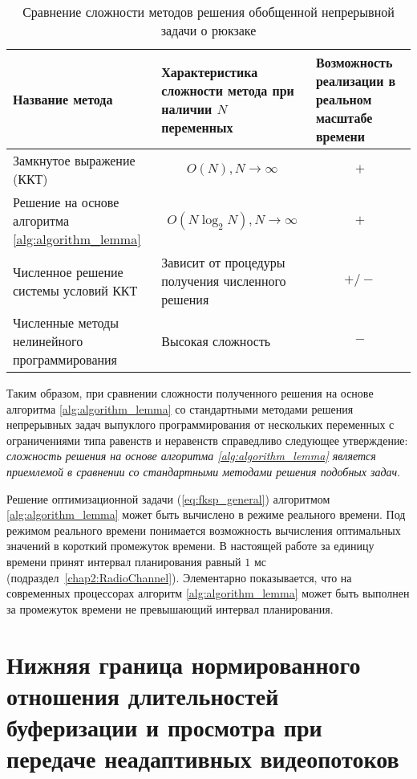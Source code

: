 \begin{table}[!h]
    \caption{Сравнение сложности методов решения обобщенной непрерывной задачи о рюкзаке}
    \begin{center}
		\label{tab:nonadaptiveComplexity}
	    \begin{tabular}{| C{5cm} | C{5cm} | C{5cm} |}
	    	\hline
	    	Название метода & Характеристика сложности метода при наличии $N$ переменных & Возможность реализации в реальном масштабе времени\\
	    	\hline
			Замкнутое выражение (ККТ) & $$O(N), N\to\infty$$ & $$+$$\\
	    	\hline
			Решение на основе алгоритма \ref{alg:algorithm_lemma} & $$O(N \log_2 N), N\to\infty$$ & $$+$$\\
	    	\hline
	    	Численное решение системы условий ККТ & Зависит от процедуры получения численного решения & $$+/-$$ \\
	    	\hline
	    	Численные методы нелинейного программирования & Высокая сложность & $$-$$ \\
	    	\hline
    	\end{tabular}
	\end{center}
\end{table}

Таким образом, при сравнении сложности полученного решения на основе алгоритма \ref{alg:algorithm_lemma} со стандартными методами решения непрерывных задач выпуклого программирования от нескольких переменных с ограничениями типа равенств и неравенств справедливо следующее утверждение: \textit{сложность решения на основе алгоритма \ref{alg:algorithm_lemma} является приемлемой в сравнении со стандартными методами решения подобных задач}.

Решение оптимизационной задачи (\ref{eq:fksp_general}) алгоритмом \ref{alg:algorithm_lemma} может быть вычислено в режиме реального времени. Под режимом реального времени понимается возможность вычисления оптимальных значений в короткий промежуток времени. В настоящей работе за единицу времени принят интервал планирования равный $1$ мс (подраздел~\ref{chap2:RadioChannel}). Элементарно показывается, что на современных процессорах алгоритм \ref{alg:algorithm_lemma} может быть выполнен за промежуток времени не превышающий интервал планирования.

\section{Нижняя граница нормированного отношения длительностей буферизации и просмотра при передаче неадаптивных видеопотоков}
\label{chap3:LowerBoundForG}

